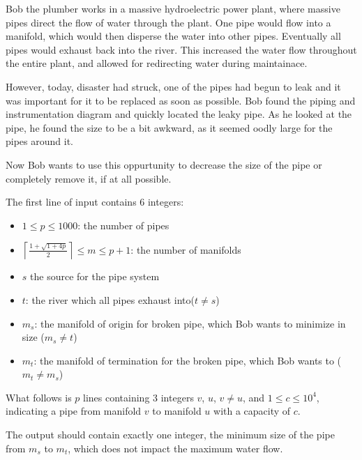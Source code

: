 Bob the plumber works in a massive hydroelectric power plant, where massive pipes direct the flow of water through the plant.
One pipe would flow into a manifold, which would then disperse the water into other pipes.
Eventually all pipes would exhaust back into the river.
This increased the water flow throughout the entire plant, and allowed for redirecting water during maintainace.

However, today, disaster had struck, one of the pipes had begun to leak and it was important for it to be replaced as soon as possible.
Bob found the piping and instrumentation diagram and quickly located the leaky pipe.
As he looked at the pipe, he found the size to be a bit awkward, as it seemed oodly large for the pipes around it.

Now Bob wants to use this oppurtunity to decrease the size of the pipe or completely remove it, if at all possible.

\begin{Input}
The first line of input contains 6 integers:

\begin{itemize}
 \item $1 \le p \le 1000$: the number of pipes
 \item $\left\lceil \frac{1+\sqrt{1+4p}}{2} \right\rceil \le m \le p+1$: the number of manifolds
 \item $s$ the source for the pipe system
 \item $t$: the river which all pipes exhaust into($t \ne s$)
 \item $m_s$: the manifold of origin for broken pipe, which Bob wants to minimize in size ($m_s \ne t$)
 \item $m_t$: the manifold of termination for the broken pipe, which Bob wants to ($m_t \ne m_s$)
\end{itemize}
What follows is $p$ lines containing 3 integers $v$, $u$, $v \ne u$, and $1 \le c \le 10^4$, indicating a pipe from manifold $v$ to manifold $u$ with a capacity of $c$.
\end{Input}

\begin{Output}
The output should contain exactly one integer, the minimum size of the pipe from $m_s$ to $m_t$, which does not impact the maximum water flow.
\end{Output}

